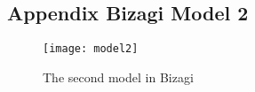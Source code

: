 \begin{landscape}
	\section{Appendix Bizagi Model 2}
	\label{app:appendix_model2}
	\begin{figure}[H]
		\texttt{[image: model2]}
		\caption{The second model in Bizagi}
		\label{fig:model2}
	\end{figure}
\end{landscape}

\clearpage
